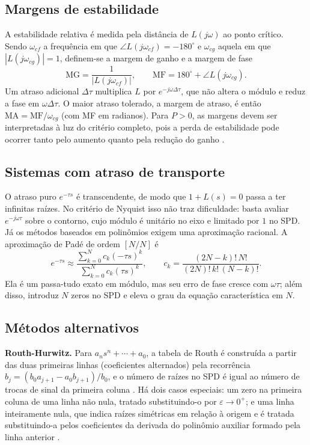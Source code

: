 \documentclass[12pt]{article}
\begin{document}
\subsection{Margens de estabilidade}

A estabilidade relativa é medida pela distância de $L(j\omega)$ ao ponto crítico. Sendo $\omega_{cf}$ a frequência em que $\angle L(j\omega_{cf})=-180^\circ$ e $\omega_{cg}$ aquela em que $|L(j\omega_{cg})|=1$, definem-se a margem de ganho e a margem de fase
\begin{equation}
  \mathrm{MG} = \frac{1}{|L(j\omega_{cf})|}, \qquad
  \mathrm{MF} = 180^\circ + \angle L(j\omega_{cg}).
\end{equation}
Um atraso adicional $\Delta\tau$ multiplica $L$ por $e^{-j\omega\Delta\tau}$, que não altera o módulo e reduz a fase em $\omega\Delta\tau$. O maior atraso tolerado, a margem de atraso, é então $\mathrm{MA}=\mathrm{MF}/\omega_{cg}$ (com MF em radianos). Para $P>0$, as margens devem ser interpretadas à luz do critério completo, pois a perda de estabilidade pode ocorrer tanto pelo aumento quanto pela redução do ganho \cite{skogestad2005}.

\subsection{Sistemas com atraso de transporte}

O atraso puro $e^{-\tau s}$ é transcendente, de modo que $1+L(s)=0$ passa a ter infinitas raízes. No critério de Nyquist isso não traz dificuldade: basta avaliar $e^{-j\omega\tau}$ sobre o contorno, cujo módulo é unitário no eixo e limitado por $1$ no SPD. Já os métodos baseados em polinômios exigem uma aproximação racional. A aproximação de Padé de ordem $[N/N]$ \cite{pade1892} é
\begin{equation}
  e^{-\tau s} \approx \frac{\sum_{k=0}^{N} c_k(-\tau s)^k}{\sum_{k=0}^{N} c_k(\tau s)^k},
  \qquad c_k=\frac{(2N-k)!\,N!}{(2N)!\,k!\,(N-k)!}.
  \label{eq:pade}
\end{equation}
Ela é um passa-tudo exato em módulo, mas seu erro de fase cresce com $\omega\tau$; além disso, introduz $N$ zeros no SPD e eleva o grau da equação característica em $N$.

\subsection{Métodos alternativos}

\textbf{Routh-Hurwitz.} Para $a_n s^n+\cdots+a_0$, a tabela de Routh é construída a partir das duas primeiras linhas (coeficientes alternados) pela recorrência $b_j=(b_0a_{j+1}-a_0b_{j+1})/b_0$, e o número de raízes no SPD é igual ao número de trocas de sinal da primeira coluna \cite{routh1877,hurwitz1895}. Há dois casos especiais: um zero na primeira coluna de uma linha não nula, tratado substituindo-o por $\varepsilon\to 0^+$; e uma linha inteiramente nula, que indica raízes simétricas em relação à origem e é tratada substituindo-a pelos coeficientes da derivada do polinômio auxiliar formado pela linha anterior \cite{nise2017}.
\end{document}
